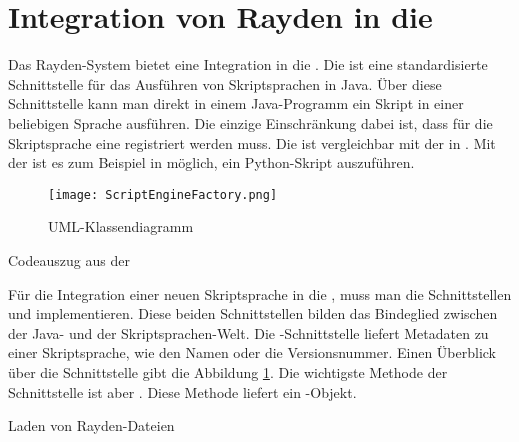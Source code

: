 
\section{Integration von Rayden in die }
\label{cha:implementJSA}

Das Rayden-System bietet eine Integration in die . Die  ist eine standardisierte Schnittstelle für das Ausführen von Skriptsprachen in Java. Über diese Schnittstelle kann man direkt in einem Java-Programm ein Skript in einer beliebigen Sprache ausführen. Die einzige Einschränkung dabei ist, dass für die Skriptsprache eine  registriert werden muss. Die  ist vergleichbar mit der  \cite{DLR} in . Mit der  ist es zum Beispiel in  möglich, ein Python-Skript \cite{Python} auszuführen.

\begin{figure}
\centering
\texttt{[image: ScriptEngineFactory.png]}
\caption{ UML-Klassendiagramm}
\label{fig:scriptEngineFactoryUml}
\end{figure}

\begin{program}

\caption{Codeauszug aus der }
\label{prog:scriptEngine}
\end{program}

\SuperPar
Für die Integration einer neuen Skriptsprache in die , muss man die Schnittstellen  und  implementieren. Diese beiden Schnittstellen bilden das Bindeglied zwischen der Java- und der Skriptsprachen-Welt. Die -Schnittstelle liefert Metadaten zu einer Skriptsprache, wie den Namen oder die Versionsnummer. Einen Überblick über die Schnittstelle gibt die Abbildung \ref{fig:scriptEngineFactoryUml}. Die wichtigste Methode der Schnittstelle ist aber . Diese Methode liefert ein -Objekt.

\begin{program}

\caption{Laden von Rayden-Dateien}
\label{prog:loadFile}
\end{program}

